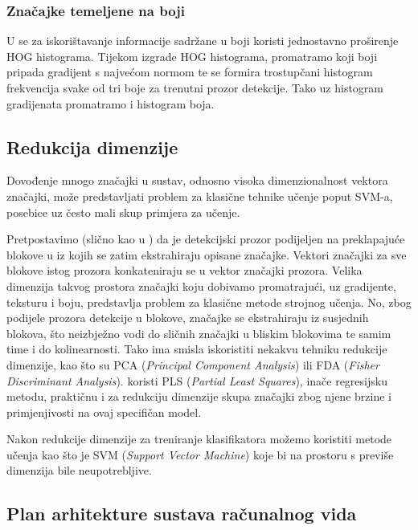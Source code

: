 \documentclass[seminar]{fer}
\begin{document}
\subsubsection{Značajke temeljene na boji}

U \cite{Schwartz} se za iskorištavanje informacije sadržane u boji koristi jednostavno proširenje HOG histograma. Tijekom izgrade HOG histograma, promatramo koji boji pripada gradijent s najvećom normom te se formira trostupčani histogram frekvencija svake od tri boje za trenutni prozor detekcije. Tako uz histogram gradijenata promatramo i histogram boja.

\subsection{Redukcija dimenzije}

Dovođenje mnogo značajki u sustav, odnosno visoka dimenzionalnost vektora značajki, može predstavljati problem za klasične tehnike učenje poput SVM-a, posebice uz često mali skup primjera za učenje.

Pretpostavimo (slično kao u \cite{Schwartz}) da je detekcijski prozor podijeljen na preklapajuće blokove u iz kojih se zatim ekstrahiraju opisane značajke. Vektori značajki za sve blokove istog prozora konkateniraju se u vektor značajki prozora. Velika dimenzija takvog prostora značajki koju dobivamo promatrajući, uz gradijente, teksturu i boju, predstavlja problem za klasične metode strojnog učenja. No, zbog podijele prozora detekcije u blokove, značajke se ekstrahiraju iz susjednih blokova, što neizbježno vodi do sličnih značajki u bliskim blokovima te samim time i do kolinearnosti. Tako ima smisla iskoristiti nekakvu tehniku redukcije dimenzije, kao što su
PCA (\emph{Principal Component Analysis}) ili FDA (\emph{Fisher Discriminant Analysis}). \cite{Schwartz} koristi PLS (\emph{Partial Least Squares}), inače 
regresijsku metodu, praktičnu i za redukciju dimenzije skupa značajki zbog njene brzine i primjenjivosti na ovaj specifičan model.

Nakon redukcije dimenzije za treniranje klasifikatora možemo koristiti metode učenja kao što je SVM (\emph{Support Vector Machine}) koje bi na prostoru s 
previše dimenzija bile neupotrebljive.

\subsection{Plan arhitekture sustava računalnog vida}
\end{document}
